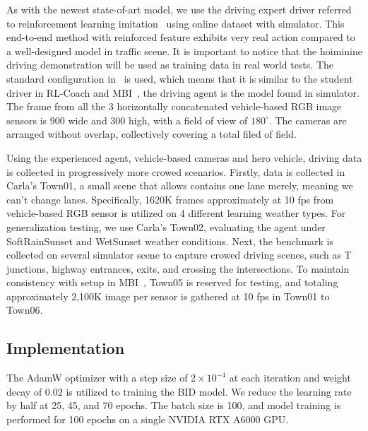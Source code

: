 \documentclass[preprint,12pt]{elsarticle}
\begin{document}
As with the newest state-of-art model, we use the driving expert driver referred to reinforcement learning imitation~\cite{Zhang:2021} using online dataset with simulator.
This end-to-end method with reinforced feature exhibits very real action compared to a well-designed model in traffic scene. 
It is important to notice that the hoiminine driving demonstration will be used as training data in real world tests.
The standard configuration in~\cite{Zhang:2021} is used, which means that it is similar to the student driver in RL-Coach\cite{Zhang:2021} and MBI~\cite{Hu:2022}, the driving agent is the model found in simulator.
The frame from all the 3 horizontally concatenated vehicle-based RGB image sensors is 900 wide and 300 high, with a field of view of $180^{\circ}$.
The cameras are arranged without overlap, collectively covering a total filed of field.


Using the experienced agent, vehicle-based cameras and hero vehicle, driving data is collected in progressively more crowed scenarios.
Firstly, data is collected in Carla's Town01, a small scene that allows contains one lane merely, meaning we can't change lanes.
Specifically, 1620K frames approximately at 10 fps from vehicle-based RGB sensor is utilized on 4 different learning weather types.
For generalization testing, we use Carla's Town02, evaluating the agent under SoftRainSunset and WetSunset weather conditions. 
Next, the benchmark is collected on several simulator scene to capture crowed driving scenes, such as T junctions, highway entrances, exits, and crossing the intersections. 
To maintain consistency with setup in MBI~\cite{Hu:2022}, Town05 is reserved for testing, and totaling approximately 2,100K image per sensor is gathered at 10 fps in Town01 to Town06. 



\subsection{Implementation}

\hspace{1pc}The AdamW optimizer with a step size of $2 \times 10^{-4}$ at each iteration and weight decay of $0.02$ is utilized to training the BID model. 
We reduce the learning rate by half at 25, 45, and 70 epochs.
The batch size is 100, 
and model training is performed for 100 epochs on a single NVIDIA RTX A6000 GPU.
\end{document}
